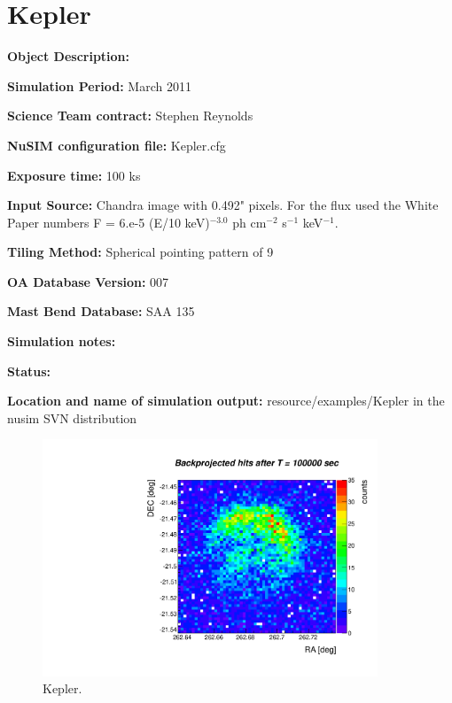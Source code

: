 
\newpage

\section{Kepler}

\textbf{Object Description:}

\textbf{Simulation Period:} March 2011

\textbf{Science Team contract:} Stephen Reynolds

\textbf{NuSIM configuration file:} Kepler.cfg

\textbf{Exposure time:} 100 ks

\textbf{Input Source:} Chandra image with 0.492" pixels.  For the flux used the White Paper numbers F = 6.e-5 (E/10 keV)$^{-3.0}$ ph cm$^{-2}$ s$^{-1}$ keV$^{-1}$.

\textbf{Tiling Method:} Spherical pointing pattern of 9

\textbf{OA Database Version:} 007

\textbf{Mast Bend Database:} SAA 135

\textbf{Simulation notes:} 

\textbf{Status:} 

\textbf{Location and name of simulation output:} resource/examples/Kepler in the nusim SVN distribution

\begin{figure}[h]
\begin{center}
\includegraphics[width=10cm]{kepler/kepler.pdf}  %
\caption{Kepler.}
\label{kepler} 
\end{center}
\end{figure}


